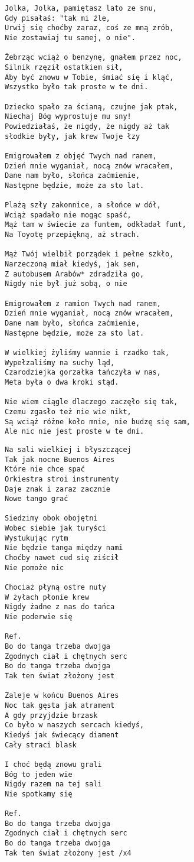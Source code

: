 \documentclass[12pt]{article}
\begin{document}
\begin{verbatim}
Jolka, Jolka, pamiętasz lato ze snu,
Gdy pisałaś: "tak mi źle,
Urwij się choćby zaraz, coś ze mną zrób,
Nie zostawiaj tu samej, o nie".

Żebrząc wciąż o benzynę, gnałem przez noc,
Silnik rzęził ostatkiem sił,
Aby być znowu w Tobie, śmiać się i kląć,
Wszystko było tak proste w te dni.

Dziecko spało za ścianą, czujne jak ptak,
Niechaj Bóg wyprostuje mu sny!
Powiedziałaś, że nigdy, że nigdy aż tak
słodkie były, jak krew Twoje łzy

Emigrowałem z objęć Twych nad ranem,
Dzień mnie wyganiał, nocą znów wracałem,
Dane nam było, słońca zaćmienie,
Następne będzie, może za sto lat.

Plażą szły zakonnice, a słońce w dół,
Wciąż spadało nie mogąc spaść,
Mąż tam w świecie za funtem, odkładał funt,
Na Toyotę przepiękną, aż strach.

Mąż Twój wielbił porządek i pełne szkło,
Narzeczoną miał kiedyś, jak sen,
Z autobusem Arabów* zdradziła go,
Nigdy nie był już sobą, o nie

Emigrowałem z ramion Twych nad ranem,
Dzień mnie wyganiał, nocą znów wracałem,
Dane nam było, słońca zaćmienie,
Następne będzie, może za sto lat.

W wielkiej żyliśmy wannie i rzadko tak,
Wypełzaliśmy na suchy ląd,
Czarodziejka gorzałka tańczyła w nas,
Meta była o dwa kroki stąd.

Nie wiem ciągle dlaczego zaczęło się tak,
Czemu zgasło też nie wie nikt,
Są wciąż różne koło mnie, nie budzę się sam,
Ale nic nie jest proste w te dni.
\end{verbatim}
\clearpage

\begin{verbatim}
Na sali wielkiej i błyszczącej
Tak jak nocne Buenos Aires
Które nie chce spać
Orkiestra stroi instrumenty
Daje znak i zaraz zacznie
Nowe tango grać

Siedzimy obok obojętni
Wobec siebie jak turyści
Wystukując rytm
Nie będzie tanga między nami
Choćby nawet cud się ziścił
Nie pomoże nic

Chociaż płyną ostre nuty
W żyłach płonie krew
Nigdy żadne z nas do tańca
Nie poderwie się

Ref.
Bo do tanga trzeba dwojga
Zgodnych ciał i chętnych serc
Bo do tanga trzeba dwojga
Tak ten świat złożony jest

Zaleje w końcu Buenos Aires
Noc tak gęsta jak atrament
A gdy przyjdzie brzask
Co było w naszych sercach kiedyś,
Kiedyś jak świecący diament
Cały straci blask

I choć będą znowu grali
Bóg to jeden wie
Nigdy razem na tej sali
Nie spotkamy się

Ref.
Bo do tanga trzeba dwojga
Zgodnych ciał i chętnych serc
Bo do tanga trzeba dwojga
Tak ten świat złożony jest /x4
\end{verbatim}
\clearpage
\end{document}
